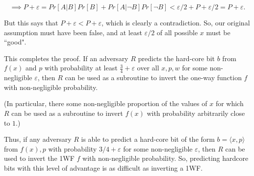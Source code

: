 \documentclass[11pt]{article}
\begin{document}
\[\implies P+\varepsilon = Pr[A|B]Pr[B] + Pr[A|\neg B]Pr[\neg B] < \varepsilon/2+P+\varepsilon/2 = P+\varepsilon.\]

But this says that \(P+\varepsilon<P+\varepsilon\), which is clearly a contradiction. So, our original assumption must have been false, and at least \(\varepsilon/2\) of all possible \(x\) must be ``good".\bigskip

This completes the proof. If an adversary \(R\) predicts the hard-core bit \(b\) from \(f(x)\) and \(p\) with probability at least \(\frac{3}{4}+\varepsilon\) over all \(x,p,w\) for some non-negligible \(\varepsilon\), then \(R\) can be used as a subroutine to invert the one-way function \(f\) with non-negligible probability. 

(In particular, there some non-negligible proportion of the values of \(x\) for which \(R\) can be used as a subroutine to invert \(f(x)\) with probability arbitrarily close to \(1\).)\smallskip

Thus, if any adversary \(R\) is able to predict a hard-core bit of the form \(b=\langle x,p\rangle\) from \(f(x), p\) with probability \(3/4+\varepsilon\) for some non-negligible \(\varepsilon\), then \(R\) can be used to invert the 1WF \(f\) with non-negligible probability. So, predicting hardcore bits with this level of advantage is as difficult as inverting a 1WF.
\end{document}
